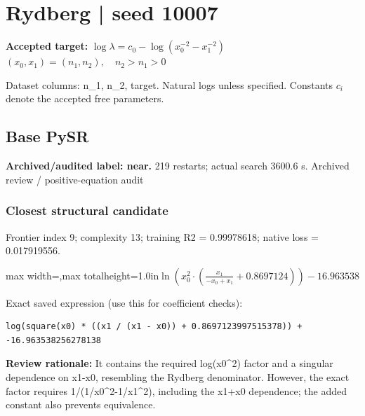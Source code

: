 \documentclass[10pt,letterpaper,landscape]{article}
\begin{document}
\section*{Rydberg | seed 10007}
\textbf{Accepted target:} $\displaystyle \log\lambda=c_0-\log\!\left(x_0^{-2}-x_1^{-2}\right)$\hfill $(x_0,x_1)=(n_1,n_2),\quad n_2>n_1>0$\par
{\small Dataset columns: n\_1, n\_2, target. Natural logs unless specified. Constants $c_i$ denote the accepted free parameters.}\par\medskip
\begin{minipage}[t]{0.485\textwidth}
\subsection*{Base PySR}
\textbf{Archived/audited label: near.} 219 restarts; actual search 3600.6 s.
{\small Archived review / positive-equation audit}
\subsubsection*{Closest structural candidate}
Frontier index 9; complexity 13; training R2 = 0.99978618; native loss = 0.017919556.
\begin{center}\begin{adjustbox}{max width=\linewidth,max totalheight=1.0in}$\displaystyle \ln{\left(x_{0}^{2} \cdot \left(\frac{x_{1}}{- x_{0} + x_{1}} + 0.8697124\right) \right)} - 16.963538$\end{adjustbox}\end{center}
{\scriptsize Exact saved expression (use this for coefficient checks):}
\begin{lstlisting}
log(square(x0) * ((x1 / (x1 - x0)) + 0.8697123997515378)) + -16.963538256278138
\end{lstlisting}
{\small\textbf{Review rationale:} It contains the required log(x0\textasciicircum{}2) factor and a singular dependence on x1-x0, resembling the Rydberg denominator. However, the exact factor requires 1/(1/x0\textasciicircum{}2-1/x1\textasciicircum{}2), including the x1+x0 dependence; the added constant also prevents equivalence.}

\end{minipage}
\end{document}
